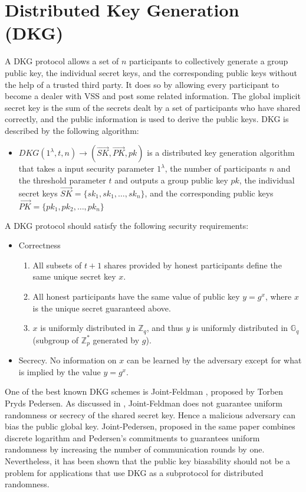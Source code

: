 \documentclass[letterpaper,twocolumn,10pt]{article}
\theoremstyle{definition}
\theoremstyle{remark}
\begin{document}
\section{Distributed Key Generation (DKG)}
\label{appendix:dkg}
A DKG protocol allows a set of $n$ participants to collectively generate a group public key, the individual secret keys, and the corresponding public keys without the help of a trusted third party. It does so by allowing every participant to become a dealer with VSS and post some related information. The global implicit secret key is the sum of the secrets dealt by a set of participants who have shared correctly, and the public information is used to derive the public keys. DKG is described by the following algorithm:
\begin{itemize}
    \item $DKG(1^{\lambda}, t, n) \rightarrow (\vec{SK}, \vec{PK}, pk)$ is a distributed key generation algorithm that takes a input security parameter $1^\lambda$, the number of participants $n$ and the threshold parameter $t$ and outputs a group public key $pk$, the individual secret keys $\vec{SK} = \{sk_1, sk_1, \ldots, sk_n\}$, and the corresponding public keys $\vec{PK} = \{pk_1, pk_2, \ldots, pk_n\}$
\end{itemize}

A DKG protocol should satisfy the following security requirements:
\begin{itemize}
    \item Correctness
        \begin{enumerate}
        \item All subsets of $t+1$ shares provided by honest participants define the same unique secret key $x$.
        \item All honest participants have the same value of public key $y=g^x$, where $x$ is the unique secret guaranteed above.
        \item $x$ is uniformly distributed in $\mathbb{Z}_q$, and thus $y$ is uniformly distributed in $\mathbb{G}_q$ (subgroup of $\mathbb{Z}^*_p$ generated by $g$).
        \end{enumerate}
        
    \item Secrecy. No information on $x$ can be learned by the adversary except for what is implied by the value $y = g^x$.
\end{itemize}

One of the best known DKG schemes is Joint-Feldman \cite{pedersen1991threshold}, proposed by Torben Pryds Pedersen. As discussed in \cite{gennaro1999secure}, Joint-Feldman does not guarantee uniform randomness or secrecy of the shared secret key. Hence a malicious adversary can bias the public global key. Joint-Pedersen, proposed in the same paper combines discrete logarithm and Pedersen's commitments to guarantees uniform randomness by increasing the number of communication rounds by one.  Nevertheless, it has been shown that the public key biasability should not be a problem for applications that use DKG as a subprotocol for distributed randomness.
\end{document}
